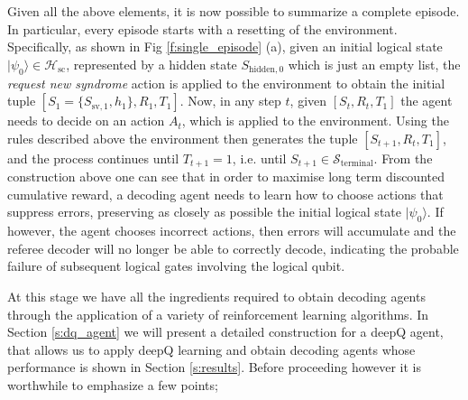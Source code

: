 \documentclass[twocolumn,preprintnumbers,amsmath,amssymb,notitlepage,nofootinbib,longbibliography,superscriptaddress,aps,pra,10pt]{revtex4-1}
\begin{document}
	Given all the above elements, it is now possible to summarize a complete episode. 
	In particular, every episode starts with a resetting of the environment.
	Specifically, as shown in Fig \ref{f:single_episode} (a), given an initial logical state $|\psi_0\rangle \in \mathcal{H}_{\mathrm{sc}}$, represented by a hidden state $S_{\mathrm{hidden},0}$ which is just an empty list, the \emph{request new syndrome} action is applied to the environment to obtain the initial tuple $[S_{1} = \{S_{\mathrm{sv},1},h_{1}\},R_{1},T_{1}]$. 
	Now, in any step $t$, given $[S_{t},R_{t},T_{1}]$ the agent needs to decide on an action $A_t$, which is applied to the environment.
	Using the rules described above the environment then generates the tuple $[S_{t+1},R_{t},T_{1}]$, and the process continues until $T_{t+1} = 1$, i.e. until $S_{t+1} \in \mathcal{S}_\mathrm{terminal}$.
	From the construction above one can see that in order to maximise long term discounted cumulative reward, a decoding agent needs to learn how to choose actions that suppress errors, preserving as closely as possible the initial logical state $|\psi_0\rangle$. 
	If however, the agent chooses incorrect actions, then errors will accumulate and the referee decoder will no longer be able to correctly decode, indicating the probable failure of subsequent logical gates involving the logical qubit.

	At this stage we have all the ingredients required to obtain decoding agents through the application of a variety of reinforcement learning algorithms. In Section \ref{s:dq_agent} we will present a detailed construction for a deepQ agent, that allows us to apply deepQ learning and obtain decoding agents whose performance is shown in Section \ref{s:results}. Before proceeding however it is worthwhile to emphasize a few points;
\end{document}
